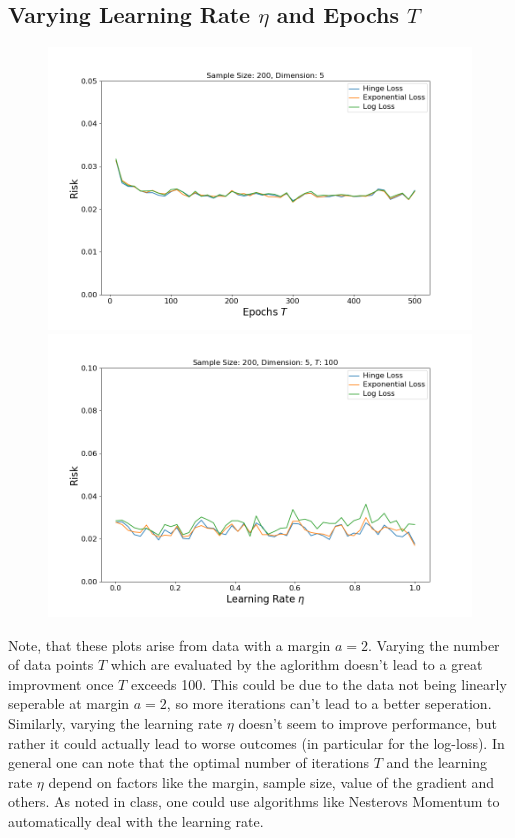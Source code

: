 \documentclass[a4paper, 11pt]{article} %
\begin{document}
\subsection*{Varying Learning Rate $\eta$ and Epochs $T$}

\begin{figure}[H]
\centering
\includegraphics[scale=0.4]{Epochs}
\includegraphics[scale=0.4]{LearningRate}
\end{figure}

Note, that these plots arise from data with a margin $a=2$. 
Varying the number of data points $T$ which are evaluated by the aglorithm doesn't lead to a great improvment once $T$ exceeds 100. This could be due to the data not being linearly seperable at margin $a=2$, so more iterations can't lead to a better seperation. Similarly, varying the learning rate $\eta$ doesn't seem to improve performance, but rather it could actually lead to worse outcomes (in particular for the log-loss). In general one can note that the optimal number of iterations $T$ and the learning rate $\eta$ depend on factors like the margin, sample size, value of the gradient and others. As noted in class, one could use algorithms like Nesterovs Momentum to automatically deal with the learning rate. 
\end{document}
